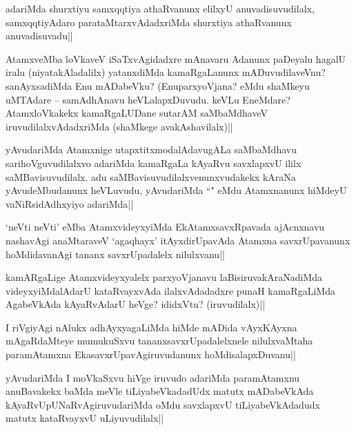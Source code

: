 \begin{artha}
adariMda shurxtiyu samxqqtiya athaRvanunx elilxyU anuvadisuvudilalx, samxqqtiyAdaro parataMtarxvAdadxriMda shurxtiya athaRvanunx anuvadisuvadu||
\end{artha}


\begin{artha}
AtamxveMba loVkaveV iSaTxvAgidadxre mAnavaru Adanunx paDeyalu hagalU iralu (niyatakAladalilx) yatanxdiMda kamaRgaLanunx mADuvudilaveVnu? sanAyxsadiMda Enu mADabeVku? (EnuparxyoVjana? eMdu shaMkeyu uMTAdare -- samAdhAnavu heVLalapxDuvudu. keVLu EneMdare? AtamxloVkakekx kamaRgaLUDane sutarAM saMbaMdhaveV iruvudilalxvAdadxriMda (shaMkege avakAshavilalx)||
\end{artha}


\begin{artha}
yAvudariMda Atamxnige utapxtitxmodalAdavugALa saMbaMdhavu sarihoVguvudilalxvo adariMda kamaRgaLa kAyaRvu savxlapxvU ililx saMBavisuvudilalx. adu saMBavisuvudilalxvenunxvudakekx kAraNa yAvudeMbudanunx heVLuvudu, yAvudariMda ``\stext" eMdu Atamxnanunx hiMdeyU vaNiRsidAdhxyiyo adariMda||
\end{artha}

\begin{artha}
`neVti neVti' eMba AtamxvideyxyiMda EkAtamxsavxRpavada ajAcnxnavu nashavAgi anaMtaraveV `agaqhayx' itAyxdirUpavAda Atamxna savxrUpavanunx hoMdidavanAgi tananx savxrUpadalelx nilulxvanu||
\end{artha}


\begin{artha}
kamARgaLige Atamxvideyxyalelx parxyoVjanavu laBisiruvakAraNadiMda videyxyiMdalAdarU kataRvayxvAda ilalxvAdadadxre punaH kamaRgaLiMda AgabeVkAda kAyaRvAdarU heVge? ididxVtu? (iruvudilalx)||
\end{artha}

\begin{artha}
I riVgiyAgi nAlukx adhAyxyagaLiMda hiMde mADida vAyxKAyxna mAgaRdaMteye mumukuSxvu tananxsavxrUpadalelxnele nilulxvaMtaha paramAtamxna EkasavxrUpavAgiruvudanunx hoMdisalapxDuvanu||
\end{artha}

\begin{artha}
yAvudariMda I moVkaSxvu hiVge iruvudo adariMda paramAtamxnu anuBavakekx baMda meVle tiLiyabeVkadadUdx matutx mADabeVkAda kAyaRvUpUNaRvAgiruvudariMda  oMdu savxlapxvU tiLiyabeVkAdadudx matutx kataRvayxvU uLiyuvudilalx||
\end{artha}

